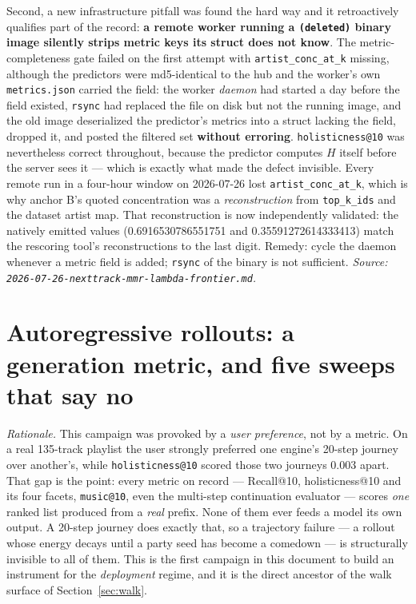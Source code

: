 \documentclass[11pt]{article}
\begin{document}
Second, a new infrastructure pitfall was found the hard way and it retroactively
qualifies part of the record: \textbf{a remote worker running a
\texttt{(deleted)} binary image silently strips metric keys its struct does not
know}. The metric-completeness gate failed on the first attempt with
\texttt{artist\_conc\_at\_k} missing, although the predictors were md5-identical
to the hub and the worker's own \texttt{metrics.json} carried the field: the
worker \emph{daemon} had started a day before the field existed, \texttt{rsync}
had replaced the file on disk but not the running image, and the old image
deserialized the predictor's metrics into a struct lacking the field, dropped it,
and posted the filtered set \textbf{without erroring}. \texttt{holisticness@10}
was nevertheless correct throughout, because the predictor computes $H$ itself
before the server sees it --- which is exactly what made the defect invisible.
Every remote run in a four-hour window on 2026-07-26 lost
\texttt{artist\_conc\_at\_k}, which is why anchor B's quoted concentration was a
\emph{reconstruction} from \texttt{top\_k\_ids} and the dataset artist map. That
reconstruction is now independently validated: the natively emitted values
(\num{0.6916530786551751} and \num{0.35591272614333413}) match the rescoring
tool's reconstructions to the last digit. Remedy: cycle the daemon whenever a
metric field is added; \texttt{rsync} of the binary is not sufficient.
\emph{Source: \texttt{2026-07-26-nexttrack-mmr-lambda-frontier.md}.}

\section{Autoregressive rollouts: a generation metric, and five sweeps that say no}
\label{sec:rollout}
\emph{Rationale.} This campaign was provoked by a \emph{user preference}, not by a
metric. On a real 135-track playlist the user strongly preferred one engine's
20-step journey over another's, while \texttt{holisticness@10} scored those two
journeys \num{0.003} apart. That gap is the point: every metric on record ---
Recall@10, holisticness@10 and its four facets, \texttt{music@10}, even the
multi-step continuation evaluator --- scores \emph{one} ranked list produced from a
\emph{real} prefix. None of them ever feeds a model its own output. A 20-step
journey does exactly that, so a trajectory failure --- a rollout whose energy
decays until a party seed has become a comedown --- is structurally invisible to
all of them. This is the first campaign in this document to build an instrument
for the \emph{deployment} regime, and it is the direct ancestor of the walk
surface of Section~\ref{sec:walk}.
\end{document}
